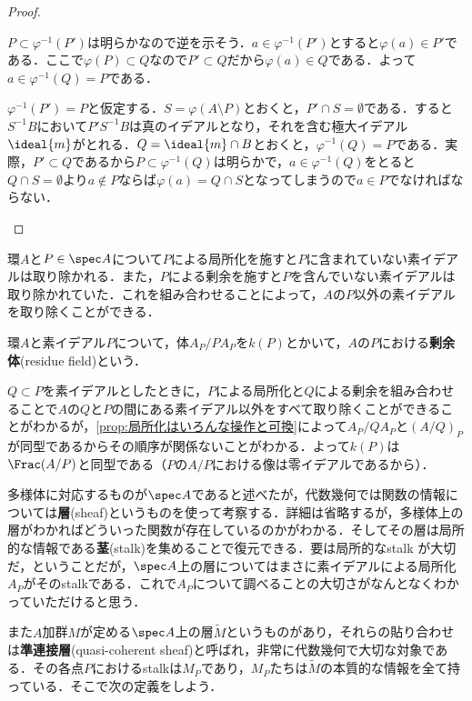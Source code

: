 \begin{proof}
	\begin{eqv}
		\item $P\subset\varphi^{-1}(P')$は明らかなので逆を示そう．$a\in\varphi^{-1}(P')$とすると$\varphi(a)\in P'$である．ここで$\varphi(P)\subset Q$なので$P'\subset Q$だから$\varphi(a)\in Q$である．よって$a\in\varphi^{-1}(Q)=P$である．
		
		\item 	$\varphi^{-1}(P')=P$と仮定する．$S=\varphi(A\setminus P)$とおくと，$P'\cap S=\emptyset$である．すると$S^{-1}B$において$P'S^{-1}B$は真のイデアルとなり，それを含む極大イデアル$\ideal{m}$がとれる．$Q=\ideal{m}\cap B$とおくと，$\varphi^{-1}(Q)=P$である．実際，$P'\subset Q$であるから$P\subset\varphi^{-1}(Q)$は明らかで，$a\in\varphi^{-1}(Q)$をとると$Q\cap S=\emptyset$より$a\not\in P$ならば$\varphi(a)=Q\cap S$となってしまうので$a\in P$でなければならない．
	\end{eqv}
\end{proof}

環$A$と$P\in\spec A$について$P$による局所化を施すと$P$に含まれていない素イデアルは取り除かれる．また，$P$による剰余を施すと$P$を含んでいない素イデアルは取り除かれていた．これを組み合わせることによって，$A$の$P$以外の素イデアルを取り除くことができる．
\begin{defi}[剰余体]
	環$A$と素イデアル$P$について，体$A_P/PA_P$を$k(P)$とかいて，$A$の$P$における\textbf{剰余体}(residue field)という．
\end{defi}

$Q\subset P$を素イデアルとしたときに，$P$による局所化と$Q$による剰余を組み合わせることで$A$の$Q$と$P$の間にある素イデアル以外をすべて取り除くことができることがわかるが，\ref{prop:局所化はいろんな操作と可換}によって$A_P/QA_P$と$(A/Q)_P$が同型であるからその順序が関係ないことがわかる．よって$k(P)$は$\Frac (A/P)$と同型である（$P$の$A/P$における像は零イデアルであるから）．

\begin{tightcurve}
	多様体に対応するものが$\spec A$であると述べたが，代数幾何では関数の情報については\textbf{層}(sheaf)というものを使って考察する．詳細は省略するが，多様体上の層がわかればどういった関数が存在しているのかがわかる．そしてその層は局所的な情報である\textbf{茎}(stalk)を集めることで復元できる．要は局所的なstalk が大切だ，ということだが，$\spec A$上の層についてはまさに素イデアルによる局所化$A_P$がそのstalkである．これで$A_P$について調べることの大切さがなんとなくわかっていただけると思う．
	
	また$A$加群$M$が定める$\spec A$上の層$\widetilde{M}$というものがあり，それらの貼り合わせは\textbf{準連接層}(quasi-coherent sheaf)と呼ばれ，非常に代数幾何で大切な対象である．その各点$P$におけるstalkは$M_P$であり，$M_P$たちは$\widetilde{M}$の本質的な情報を全て持っている．そこで次の定義をしよう．
\end{tightcurve}


